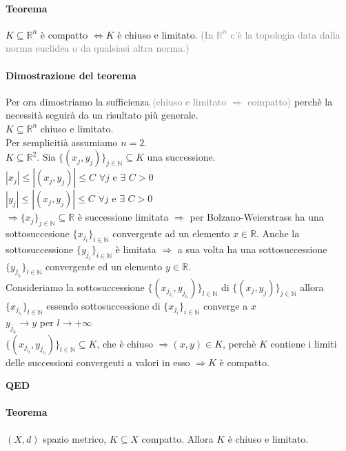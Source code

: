 \documentclass{article}
\newcommand{\R}{\mathbb{R}}
\newcommand{\N}{\mathbb{N}}
\begin{document}
\paragraph{Teorema}
$K \subseteq \R^n$ è compatto $\Leftrightarrow K$ è chiuso e limitato. \textcolor{grey}{(In $\R^n$ c'è la topologia data dalla norma euclidea o da qualsiasi altra norma.)}

\paragraph{{Dimostrazione del teorema}}
Per ora dimostriamo la sufficienza \textcolor{grey}{(chiuso e limitato $\Rightarrow$ compatto)} perchè la necessità seguirà da un risultato più generale.\\
$K \subseteq \R^n$ chiuso e limitato.\\
Per semplicitià assumiamo $n=2$.\\
$K \subseteq \R^2$. Sia $\{(x_j,y_j)\}_{j \in \N} \subseteq K$ una successione.\\
$|x_j|\leq |(x_j,y_j)|\leq C \,\, \forall j$ e $ \exists\,\, C >0$\\
$|y_j|\leq |(x_j,y_j)|\leq C \,\, \forall j$ e $ \exists\,\, C >0$\\
$\Rightarrow \{x_j\}_{j\in\N} \subseteq \R$ è successione limitata $\Rightarrow$ per Bolzano-Weierstrass ha una sottosuccesione $\{x_{j_i}\}_{i\in\N}$ convergente ad un elemento $x \in \R$. Anche la sottosuccessione $\{y_{j_i}\}_{i\in\N}$ è limitata $\Rightarrow$ a sua volta ha una sottosuccessione $\{y_{j_{i_l}}\}_{l\in\N}$ convergente ed un elemento $y \in \R$.\\ Consideriamo la sottosuccessione $\{(x_{j_{i_l}},y_{j_{i_l}})\}_{l \in \N}$ di $\{(x_j,y_j)\}_{j\in\N}$ allora $\{x_{j_{i_l}}\}_{l \in \N}$ essendo sottosuccessione di $\{x_{j_i}\}_{i\in\N}$ converge a $x$\\
$y_{j_{i_l}}\rightarrow y$ per $l\rightarrow+\infty$\\
$\{(x_{j_{i_l}},y_{j_{i_l}})\}_{l\in \N} \subseteq K$, che è chiuso $\Rightarrow (x,y)\in K$, perchè $K$ contiene i limiti delle successioni convergenti a valori in esso $\Rightarrow K$ è compatto.
\begin{flushright}
\textbf{QED}
\end{flushright}

\paragraph{{Teorema}}
$(X,d)$ spazio metrico, $K \subseteq X$ compatto. Allora $K$ è chiuso e limitato.
\end{document}
